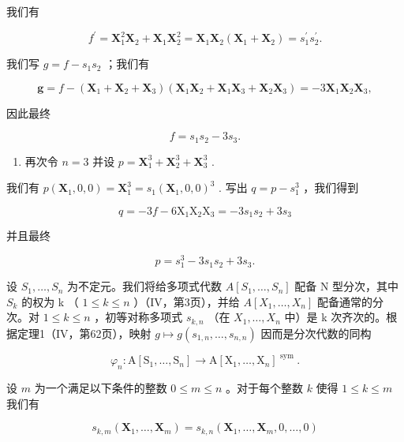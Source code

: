 我们有

\[
f ^ {\prime} = \mathbf {X} _ {1} ^ {2} \mathbf {X} _ {2} + \mathbf {X} _ {1} \mathbf {X} _ {2} ^ {2} = \mathbf {X} _ {1} \mathbf {X} _ {2} (\mathbf {X} _ {1} + \mathbf {X} _ {2}) = s _ {1} ^ {\prime} s _ {2} ^ {\prime}.
\]

我们写 \(g = f - s_1s_2\) ；我们有

\[
\boldsymbol {g} = f - \left(\mathbf {X} _ {1} + \mathbf {X} _ {2} + \mathbf {X} _ {3}\right) \left(\mathbf {X} _ {1} \mathbf {X} _ {2} + \mathbf {X} _ {1} \mathbf {X} _ {3} + \mathbf {X} _ {2} \mathbf {X} _ {3}\right) = - 3 \mathbf {X} _ {1} \mathbf {X} _ {2} \mathbf {X} _ {3},
\]

因此最终

\[
f = s _ {1} s _ {2} - 3 s _ {3}.
\]

\begin{enumerate}
\def\labelenumi{\arabic{enumi})}
\setcounter{enumi}{1}
\tightlist
\item
  再次令 \(n = 3\) 并设 \(p = \mathbf{X}_1^3 + \mathbf{X}_2^3 + \mathbf{X}_3^3\) .
\end{enumerate}

我们有 \(p(\mathbf{X}_1, 0, 0) = \mathbf{X}_1^3 = s_1(\mathbf{X}_1, 0, 0)^3\) . 写出 \(q = p - s_1^3\) ，我们得到

\[
q = - 3 f - 6 \mathrm{X} _ {1} \mathrm{X} _ {2} \mathrm{X} _ {3} = - 3 s _ {1} s _ {2} + 3 s _ {3}
\]

并且最终

\[
p = s _ {1} ^ {3} - 3 s _ {1} s _ {2} + 3 s _ {3}.
\]

设 \(S_1, \ldots, S_n\) 为不定元。我们将给多项式代数 \(A[S_1, \ldots, S_n]\) 配备 N 型分次，其中 \(S_k\) 的权为 k （ \(1 \leqslant k \leqslant n\) ）（IV，第3页），并给 \(A[X_1, \ldots, X_n]\) 配备通常的分次。对 \(1 \leqslant k \leqslant n\) ，初等对称多项式 \(s_{k,n}\) （在 \(X_1, \ldots, X_n\) 中）是 k 次齐次的。根据定理1（IV，第62页），映射 \(g \mapsto g(s_{1,n}, \ldots, s_{n,n})\) 因而是分次代数的同构

\[
\varphi_ {n}: \mathrm{A} [ \mathrm{S} _ {1}, \dots , \mathrm{S} _ {n} ] \rightarrow \mathrm{A} [ \mathrm{X} _ {1}, \dots , \mathrm{X} _ {n} ] ^ {\text { sym }}.
\]

设 \(m\) 为一个满足以下条件的整数 \(0 \leqslant m \leqslant n\) 。对于每个整数 \(k\) 使得 \(1 \leqslant k \leqslant m\) 我们有

\[
s _ {k, m} (\mathbf {X} _ {1}, \dots , \mathbf {X} _ {m}) = s _ {k, n} (\mathbf {X} _ {1}, \dots , \mathbf {X} _ {m}, 0, \dots , 0)\tag{9}
\]

